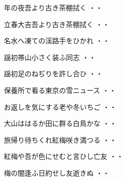 \vspace{0.6cm}
\begin{shiika}年の夜吾より古き茶棚拭く
\hfill{・・}\end{shiika}
\vspace{0.6cm}
\begin{shiika}立春大吉吾より古き茶棚拭く
\hfill{・・}\end{shiika}
\vspace{0.6cm}
\begin{shiika}名水へ凍ての渓路手をひかれ
\hfill{・・}\end{shiika}
\vspace{0.6cm}
\begin{shiika}謡初帯山小さく装ふ同志
\hfill{・・}\end{shiika}
\vspace{0.6cm}
\begin{shiika}謡初足のねぢりを許し合ひ
\hfill{・・}\end{shiika}
\vspace{0.6cm}
\begin{shiika}保養所で看る東京の雪ニュース
\hfill{・・}\end{shiika}
\vspace{0.6cm}
\begin{shiika}お返しを気にする老や冬いちご
\hfill{・・}\end{shiika}
\vspace{0.6cm}
\begin{shiika}大山ははるか田に群る白鳥かな
\hfill{・・}\end{shiika}
\vspace{0.6cm}
\begin{shiika}旅帰り待ちくれ紅梅咲き満つる
\hfill{・・}\end{shiika}
\vspace{0.6cm}
\begin{shiika}紅梅や吾が色にせむと言ひし亡友
\hfill{・・}\end{shiika}
\vspace{0.6cm}
\begin{shiika}梅の闇逢ふ日約せし友逝きぬ
\hfill{・・}\end{shiika}
